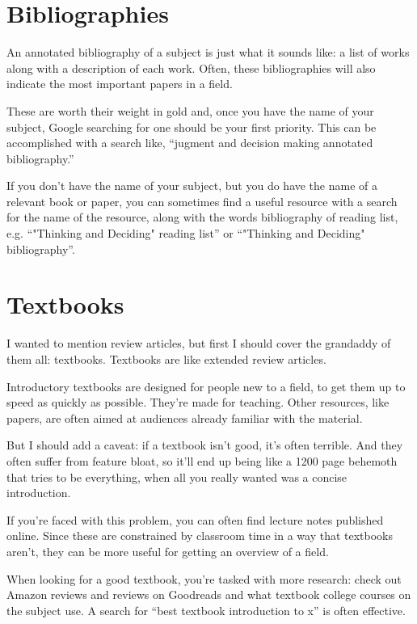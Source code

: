 \section{Bibliographies}

An annotated bibliography of a subject is just what it sounds like: a list of
works along with a description of each work. Often, these bibliographies will
also indicate the most important papers in a field.

These are worth their weight in gold and, once you have the
name of your subject, Google searching for one should be your first
priority. This can be accomplished with a search like, ``jugment and decision
making annotated bibliography.''

If you don't have the name of your subject, but you do have the name of a
relevant book or paper, you can sometimes find a useful resource with a search
for the name of the resource, along with the words bibliography of reading list,
e.g. ``"Thinking and Deciding" reading list'' or ``"Thinking and Deciding"
bibliography''.

\section{Textbooks}

I wanted to mention review articles, but first I should cover the grandaddy of
them all: textbooks. Textbooks are like extended review articles.

Introductory textbooks are designed for people new to a field, to get them up to
speed as quickly as possible. They're made for teaching. Other resources, like
papers, are often aimed at audiences already familiar with the material.

But I should add a caveat: if a textbook isn't good, it's often terrible. And
they often suffer from feature bloat, so it'll end up being like a 1200 page
behemoth that tries to be everything, when all you really wanted was a concise
introduction.

If you're faced with this problem, you can often find lecture notes published
online. Since these are constrained by classroom time in a way that textbooks
aren't, they can be more useful for getting an overview of a field.

When looking for a good textbook, you're tasked with more research: check out
Amazon reviews and reviews on Goodreads and what textbook college courses on the
subject use. A search for ``best textbook introduction to x'' is often
effective.

